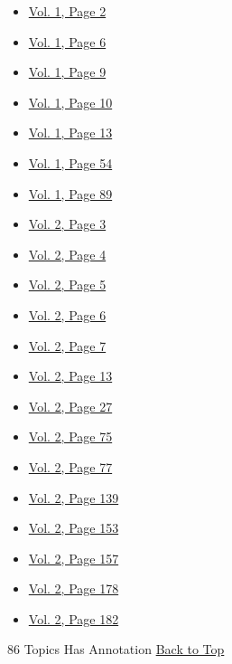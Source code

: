 \begin{itemize}
\tightlist
\item
  \protect\hyperlink{g-page-10}{Vol. 1, Page 2}
\item
  \protect\hyperlink{g-page-14}{Vol. 1, Page 6}
\item
  \protect\hyperlink{g-page-17}{Vol. 1, Page 9}
\item
  \protect\hyperlink{g-page-18}{Vol. 1, Page 10}
\item
  \protect\hyperlink{g-page-21}{Vol. 1, Page 13}
\item
  \protect\hyperlink{g-page-62}{Vol. 1, Page 54}
\item
  \protect\hyperlink{g-page-97}{Vol. 1, Page 89}
\item
  \protect\hyperlink{g-page-215}{Vol. 2, Page 3}
\item
  \protect\hyperlink{g-page-216}{Vol. 2, Page 4}
\item
  \protect\hyperlink{g-page-217}{Vol. 2, Page 5}
\item
  \protect\hyperlink{g-page-218}{Vol. 2, Page 6}
\item
  \protect\hyperlink{g-page-219}{Vol. 2, Page 7}
\item
  \protect\hyperlink{g-page-225}{Vol. 2, Page 13}
\item
  \protect\hyperlink{g-page-239}{Vol. 2, Page 27}
\item
  \protect\hyperlink{g-page-287}{Vol. 2, Page 75}
\item
  \protect\hyperlink{g-page-289}{Vol. 2, Page 77}
\item
  \protect\hyperlink{g-page-351}{Vol. 2, Page 139}
\item
  \protect\hyperlink{g-page-365}{Vol. 2, Page 153}
\item
  \protect\hyperlink{g-page-369}{Vol. 2, Page 157}
\item
  \protect\hyperlink{g-page-390}{Vol. 2, Page 178}
\item
  \protect\hyperlink{g-page-394}{Vol. 2, Page 182}
\end{itemize}

86 Topics Has Annotation \protect\hyperlink{g-page-1}{Back to Top}

